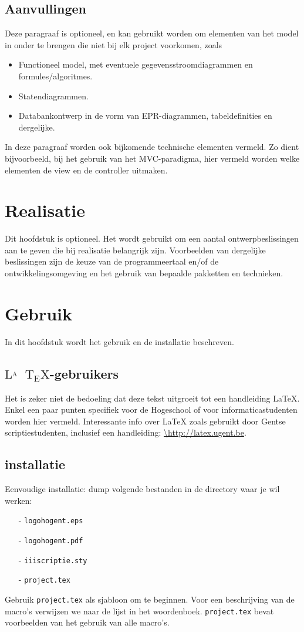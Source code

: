 \documentclass[a4paper,oneside]{report}
\def\latex{$\mathrm{L\!\!^{{}_{\scriptstyle A}} \!\!\!\!\!\;\; T\!_{\displaystyle E} \!
X}$}
\begin{document}
\newpage
\section{Aanvullingen}
Deze paragraaf is optioneel, en kan gebruikt worden om elementen van het model in
onder te brengen die niet bij elk project voorkomen, zoals
\begin{itemize}
\item Functioneel model, met eventuele gegevensstroomdiagrammen en formules/algoritmes.
\item Statendiagrammen.
\item Databankontwerp in de vorm van EPR-diagrammen, tabeldefinities en dergelijke.
\end{itemize}
In deze paragraaf worden ook bijkomende technische elementen vermeld. Zo dient
bijvoorbeeld, bij het gebruik van het MVC-paradigma, hier vermeld worden welke elementen
de view en de controller uitmaken.
\chapter{Realisatie}
Dit hoofdstuk is optioneel. Het wordt gebruikt om een aantal ontwerpbeslissingen aan te
geven die bij realisatie belangrijk zijn. Voorbeelden van dergelijke beslissingen zijn de
keuze van de programmeertaal en/of de ontwikkelingsomgeving en het gebruik van bepaalde
pakketten en technieken.
\chapter{Gebruik}
In dit hoofdstuk wordt het gebruik en de installatie beschreven.
\section{\latex-gebruikers}
Het is zeker niet de bedoeling dat deze tekst uitgroeit tot een handleiding LaTeX. Enkel
een paar punten specifiek voor de Hogeschool of voor informaticastudenten worden hier
vermeld. Interessante info over LaTeX zoals gebruikt door Gentse scriptiestudenten,
inclusief een handleiding:
\url{\http://latex.ugent.be}.
\section{installatie}
Eenvoudige installatie: dump volgende bestanden in de directory waar je wil werken:
\begin{enumerate}
\item[-]\texttt{logohogent.eps}
\item[-]\texttt{logohogent.pdf}
\item[-]\texttt{iiiscriptie.sty}
\item[-]\texttt{project.tex}
\end{enumerate}
Gebruik \texttt{project.tex} als sjabloon om te beginnen. Voor een beschrijving van de
macro's verwijzen we naar de lijst in het woordenboek. \texttt{project.tex} bevat
voorbeelden van het gebruik van alle macro's.
\end{document}
